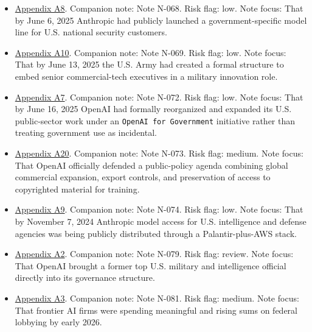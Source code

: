 \documentclass[
  american,
  11pt,
  letterpaper,
]{article}
\providecommand{\tightlist}{%
  \setlength{\itemsep}{0pt}\setlength{\parskip}{0pt}}
\begin{document}
\begin{itemize}
\tightlist
\item
  \hyperref[appendix-a8-claude-gov-models-for-u-s-national-security-customers]{Appendix
  A8}. Companion note: Note N-068. Risk flag: low. Note focus: That by
  June 6, 2025 Anthropic had publicly launched a government-specific
  model line for U.S. national security customers.
\item
  \hyperref[appendix-a10-army-launches-detachment-201-executive-innovation-corps-to-drive-tech-transformation]{Appendix
  A10}. Companion note: Note N-069. Risk flag: low. Note focus: That by
  June 13, 2025 the U.S. Army had created a formal structure to embed
  senior commercial-tech executives in a military innovation role.
\item
  \hyperref[appendix-a7-introducing-openai-for-government]{Appendix A7}.
  Companion note: Note N-072. Risk flag: low. Note focus: That by June
  16, 2025 OpenAI had formally reorganized and expanded its U.S.
  public-sector work under an \texttt{OpenAI\ for\ Government}
  initiative rather than treating government use as incidental.
\item
  \hyperref[appendix-a20-openais-proposals-for-the-us-ai-action-plan]{Appendix
  A20}. Companion note: Note N-073. Risk flag: medium. Note focus: That
  OpenAI officially defended a public-policy agenda combining global
  commercial expansion, export controls, and preservation of access to
  copyrighted material for training.
\item
  \hyperref[appendix-a9-anthropic-and-palantir-partner-to-bring-claude-ai-models-to-aws-for-u-s-government-intelligence-and-defense-operations]{Appendix
  A9}. Companion note: Note N-074. Risk flag: low. Note focus: That by
  November 7, 2024 Anthropic model access for U.S. intelligence and
  defense agencies was being publicly distributed through a
  Palantir-plus-AWS stack.
\item
  \hyperref[appendix-a2-openai-appoints-former-top-us-cyberwarrior-paul-nakasone-to-its-board-of-directors]{Appendix
  A2}. Companion note: Note N-079. Risk flag: review. Note focus: That
  OpenAI brought a former top U.S. military and intelligence official
  directly into its governance structure.
\item
  \hyperref[appendix-a3-anthropic-outspends-openai-in-biggest-ever-lobbying-quarter]{Appendix
  A3}. Companion note: Note N-081. Risk flag: medium. Note focus: That
  frontier AI firms were spending meaningful and rising sums on federal
  lobbying by early 2026.

\end{itemize}
\end{document}
